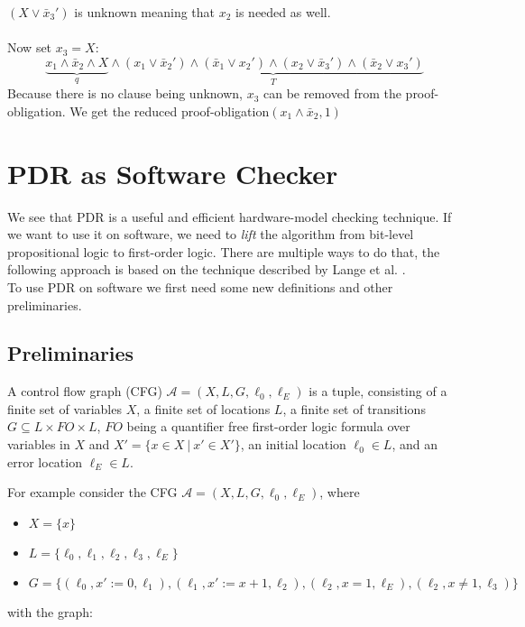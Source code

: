 \documentclass[11pt, a4paper, BCOR=10mm, ngerman, oneside]{scrbook}
\begin{document}
$(X \lor \bar x_3')$ is unknown meaning that $x_2$  is needed as well. \\ \\

Now set $x_3 = X$: \\
\begin{equation*}
\underbrace{x_1 \land \bar x_2 \land X}_{q} \land \underbrace{(x_1 \lor \bar x_2' ) \land ( \bar x_1 \lor x_2') \land (x_2 \lor \bar x_3') \land ( \bar x_2 \lor x_3')}_{T}
\end{equation*}
Because there is no clause being unknown, $x_3$ can be removed from the proof-obligation. We get the reduced proof-obligation$(x_1 \land \bar x_2, 1)$

\pagebreak


\chapter{PDR as Software Checker} \label{sec3}
We see that PDR is a useful and efficient hardware-model checking technique. If we want to use it on software, we need to \textsl{lift} the algorithm from bit-level propositional logic to first-order logic. There are multiple ways to do that, the following approach is based on the technique described by Lange et al. \cite{Zitat05}. \\ To use PDR on software we first need some new definitions and other preliminaries.

\section{Preliminaries}
A control flow graph (CFG) $\mathcal{A} = (X, L, G, \ell_0, \ell_E)$ is a tuple, consisting of a finite set of variables $X$, a finite set of locations $L$, a finite set of transitions $G \subseteq L \times FO \times L$, $FO$ being a quantifier free first-order logic formula over variables in $X$ and $X' = \{x \in X \ | \ x' \in X'\}$, an initial location $\ell_0 \in L$, and an error location $\ell_E \in L$.\par

For example consider the CFG $\mathcal{A} = (X, L, G, \ell_0, \ell_E)$, where
\begin{itemize}
\item $X = \{x\}$
\item $L = \{\ell_0, \ell_1, \ell_2, \ell_3, \ell_E\}$
\item $G = \{(\ell_0, x' := 0, \ell_1), (\ell_1, x' := x + 1, \ell_2), (\ell_2, x = 1, \ell_E), (\ell_2, x \neq 1, \ell_3) \} $
\end{itemize}
\pagebreak
with the graph: \\
\end{document}
